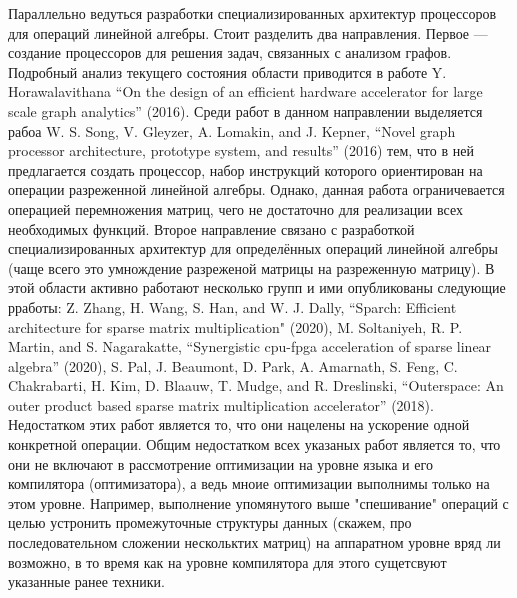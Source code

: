 \documentclass[12pt]{article}  %
\theoremstyle{remark}
\begin{document}
Параллельно ведуться разработки специализированных архитектур процессоров для операций линейной алгебры. Стоит разделить два направления. Первое --- создание процессоров для решения задач, связанных с анализом графов. Подробный анализ текущего состояния области приводится в работе Y. Horawalavithana “On the design of an efficient hardware accelerator for large scale graph analytics” (2016). Среди работ в данном направлении выделяется рабоа W. S. Song, V. Gleyzer, A. Lomakin, and J. Kepner, “Novel graph processor architecture, prototype system, and results” (2016) тем, что в ней предлагается создать процессор, набор инструкций которого ориентирован на операции разреженной линейной алгебры. Однако, данная работа ограничевается операцией перемножения матриц, чего не достаточно для реализации всех необходимых функций. Второе направление связано с разработкой специализированных архитектур для определённых операций линейной алгебры (чаще всего это умнождение разреженой матрицы на разреженную матрицу). В этой области активно работают несколько групп и ими опубликованы следующие рработы: Z. Zhang, H. Wang, S. Han, and W. J. Dally, “Sparch: Efficient architecture for sparse matrix multiplication" (2020), M. Soltaniyeh, R. P. Martin, and S. Nagarakatte, “Synergistic cpu-fpga acceleration of sparse linear algebra” (2020), S. Pal, J. Beaumont, D. Park, A. Amarnath, S. Feng, C. Chakrabarti, H. Kim, D. Blaauw, T. Mudge, and R. Dreslinski, “Outerspace: An outer product based sparse matrix multiplication accelerator” (2018). Недостатком этих работ является то, что они нацелены на ускорение одной конкретной операции. Общим недостатком всех указаных работ является то, что они не включают в рассмотрение оптимизации на уровне языка и его компилятора (оптимизатора), а ведь мноие оптимизации выполнимы только на этом уровне. Например, выполнение упомянутого выше "спешивание" операций с целью устронить промежуточные структуры данных (скажем, про последовательном сложении нескольктих матриц) на аппаратном уровне вряд ли возможно, в то время как на уровне компилятора для этого сущетсвуют указанные ранее техники.
\end{document}
